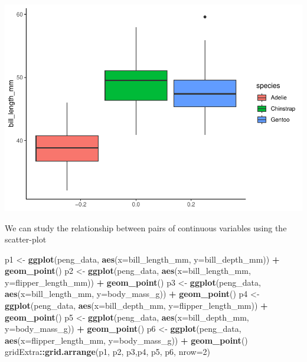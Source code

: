 \documentclass[
]{article}
\newenvironment{Shaded}{\begin{snugshade}}{\end{snugshade}}
\newcommand{\AttributeTok}[1]{\textcolor[rgb]{0.13,0.29,0.53}{#1}}
\newcommand{\DecValTok}[1]{\textcolor[rgb]{0.00,0.00,0.81}{#1}}
\newcommand{\FunctionTok}[1]{\textcolor[rgb]{0.13,0.29,0.53}{\textbf{#1}}}
\newcommand{\NormalTok}[1]{#1}
\newcommand{\OtherTok}[1]{\textcolor[rgb]{0.56,0.35,0.01}{#1}}
\newcommand{\SpecialCharTok}[1]{\textcolor[rgb]{0.81,0.36,0.00}{\textbf{#1}}}
\begin{document}
\includegraphics{EDA_files/figure-latex/unnamed-chunk-32-1.pdf}

We can study the relationship between pairs of continuous variables
using the scatter-plot

\begin{Shaded}
\begin{Highlighting}[]
\NormalTok{p1 }\OtherTok{\textless{}{-}} \FunctionTok{ggplot}\NormalTok{(peng\_data, }\FunctionTok{aes}\NormalTok{(}\AttributeTok{x=}\NormalTok{bill\_length\_mm, }\AttributeTok{y=}\NormalTok{bill\_depth\_mm)) }\SpecialCharTok{+}
  \FunctionTok{geom\_point}\NormalTok{()}
\NormalTok{p2 }\OtherTok{\textless{}{-}} \FunctionTok{ggplot}\NormalTok{(peng\_data, }\FunctionTok{aes}\NormalTok{(}\AttributeTok{x=}\NormalTok{bill\_length\_mm, }\AttributeTok{y=}\NormalTok{flipper\_length\_mm)) }\SpecialCharTok{+}
  \FunctionTok{geom\_point}\NormalTok{()}
\NormalTok{p3 }\OtherTok{\textless{}{-}} \FunctionTok{ggplot}\NormalTok{(peng\_data, }\FunctionTok{aes}\NormalTok{(}\AttributeTok{x=}\NormalTok{bill\_length\_mm, }\AttributeTok{y=}\NormalTok{body\_mass\_g)) }\SpecialCharTok{+}
  \FunctionTok{geom\_point}\NormalTok{()}
\NormalTok{p4 }\OtherTok{\textless{}{-}} \FunctionTok{ggplot}\NormalTok{(peng\_data, }\FunctionTok{aes}\NormalTok{(}\AttributeTok{x=}\NormalTok{bill\_depth\_mm, }\AttributeTok{y=}\NormalTok{flipper\_length\_mm)) }\SpecialCharTok{+}
  \FunctionTok{geom\_point}\NormalTok{()}
\NormalTok{p5 }\OtherTok{\textless{}{-}} \FunctionTok{ggplot}\NormalTok{(peng\_data, }\FunctionTok{aes}\NormalTok{(}\AttributeTok{x=}\NormalTok{bill\_depth\_mm, }\AttributeTok{y=}\NormalTok{body\_mass\_g)) }\SpecialCharTok{+}
  \FunctionTok{geom\_point}\NormalTok{()}
\NormalTok{p6 }\OtherTok{\textless{}{-}} \FunctionTok{ggplot}\NormalTok{(peng\_data, }\FunctionTok{aes}\NormalTok{(}\AttributeTok{x=}\NormalTok{flipper\_length\_mm, }\AttributeTok{y=}\NormalTok{body\_mass\_g)) }\SpecialCharTok{+}
  \FunctionTok{geom\_point}\NormalTok{()}
\NormalTok{gridExtra}\SpecialCharTok{::}\FunctionTok{grid.arrange}\NormalTok{(p1, p2, p3,p4, p5, p6, }\AttributeTok{nrow=}\DecValTok{2}\NormalTok{)}
\end{Highlighting}
\end{Shaded}
\end{document}
